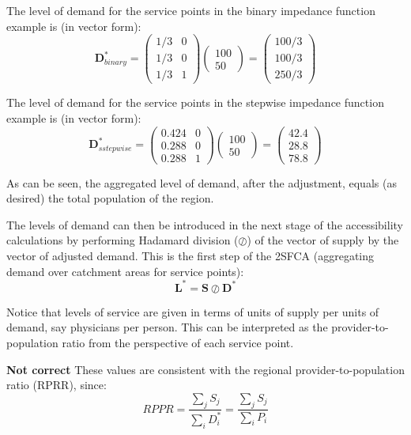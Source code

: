 \documentclass[10pt,letterpaper]{article}
\begin{document}
The level of demand for the service points in the binary impedance
function example is (in vector form): \[
\mathbf{D}^*_{binary}= \left( \begin{array}{cc}
1/3 & 0\\
1/3 & 0\\
1/3 & 1\end{array} \right)
\left( \begin{array}{c}
100\\
50\end{array} \right)=
\left( \begin{array}{c}
100/3\\
100/3\\
250/3
\end{array} \right)
\]

The level of demand for the service points in the stepwise impedance
function example is (in vector form): \[
\mathbf{D}^*_{sstepwise}= \left( \begin{array}{cc}
0.424 & 0\\
0.288 & 0\\
0.288 & 1\end{array} \right)
\left( \begin{array}{c}
100\\
50\end{array} \right)=
\left( \begin{array}{c}
42.4\\
28.8\\
78.8
\end{array} \right)
\]

As can be seen, the aggregated level of demand, after the adjustment,
equals (as desired) the total population of the region.

The levels of demand can then be introduced in the next stage of the
accessibility calculations by performing Hadamard division (\(\oslash\))
of the vector of supply by the vector of adjusted demand. This is the
first step of the 2SFCA (aggregating demand over catchment areas for
service points): \[
\mathbf{L}^* = \mathbf{S}\oslash\mathbf{D}^*
\]

Notice that levels of service are given in terms of units of supply per
units of demand, say physicians per person. This can be interpreted as
the provider-to-population ratio from the perspective of each service
point.

\textbf{Not correct} These values are consistent with the regional
provider-to-population ratio (RPRR), since: \[
RPPR = \frac{\sum_jS_j}{\sum_iD^*_i} = \frac{\sum_jS_j}{\sum_iP_i}
\]
\end{document}
